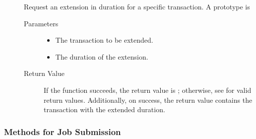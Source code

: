 \begin{description}
\item []
  Request an extension in duration for a specific transaction.
  A prototype is


  \begin{description}
    \item[ Parameters]
    \begin{itemize}
      \item {} The transaction to be extended.
      \item {} The duration of the extension.
    \end{itemize}
    \item[ Return Value]
      If the function succeeds, the return value is ; 
      otherwise, see  for valid return values. Additionally,
      on success, the return value contains the transaction with the extended
      duration.
  \end{description}  
  
\end{description}

\subsubsection{\label{WebService-Submission} Methods for Job Submission}

